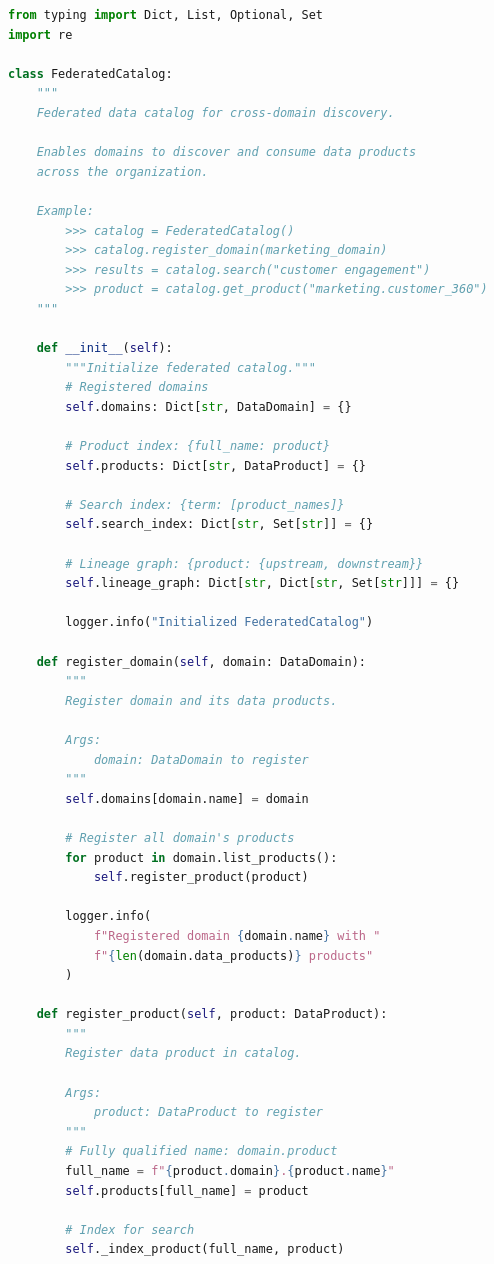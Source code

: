\begin{lstlisting}[language=Python, caption={Federated Catalog for Cross-Domain Discovery}]
from typing import Dict, List, Optional, Set
import re

class FederatedCatalog:
    """
    Federated data catalog for cross-domain discovery.

    Enables domains to discover and consume data products
    across the organization.

    Example:
        >>> catalog = FederatedCatalog()
        >>> catalog.register_domain(marketing_domain)
        >>> results = catalog.search("customer engagement")
        >>> product = catalog.get_product("marketing.customer_360")
    """

    def __init__(self):
        """Initialize federated catalog."""
        # Registered domains
        self.domains: Dict[str, DataDomain] = {}

        # Product index: {full_name: product}
        self.products: Dict[str, DataProduct] = {}

        # Search index: {term: [product_names]}
        self.search_index: Dict[str, Set[str]] = {}

        # Lineage graph: {product: {upstream, downstream}}
        self.lineage_graph: Dict[str, Dict[str, Set[str]]] = {}

        logger.info("Initialized FederatedCatalog")

    def register_domain(self, domain: DataDomain):
        """
        Register domain and its data products.

        Args:
            domain: DataDomain to register
        """
        self.domains[domain.name] = domain

        # Register all domain's products
        for product in domain.list_products():
            self.register_product(product)

        logger.info(
            f"Registered domain {domain.name} with "
            f"{len(domain.data_products)} products"
        )

    def register_product(self, product: DataProduct):
        """
        Register data product in catalog.

        Args:
            product: DataProduct to register
        """
        # Fully qualified name: domain.product
        full_name = f"{product.domain}.{product.name}"
        self.products[full_name] = product

        # Index for search
        self._index_product(full_name, product)


\end{lstlisting}
